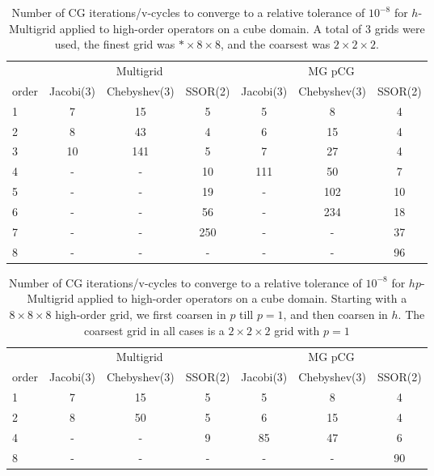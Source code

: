 
\begin{table}
  \caption{\label{tab:homg} Number of CG iterations/v-cycles to converge to a relative tolerance of $10^{-8}$ for $h$-Multigrid applied to high-order operators on a cube domain. A total of 3 grids were used, the finest grid was $*\times 8\times 8$, and the coarsest was $2\times 2\times 2$.}
		\centering
    \begin{tabular}{|l|c|c|c|c|c|c|} 
	    \hline
				    & \multicolumn{3}{c|}{Multigrid} & \multicolumn{3}{c|}{MG pCG}\\  \cline{2-7}
			order & \scriptsize Jacobi(3)  &\scriptsize  Chebyshev(3)  &\scriptsize SSOR(2) &\scriptsize Jacobi(3)  &\scriptsize  Chebyshev(3)  &\scriptsize SSOR(2) \\
			\hline
        1 & 7 & 15 & 5 & 5 & 8 & 4 \\
	    	2 & 8 & 43 & 4 & 6 & 15 & 4 \\
        3 & 10 & 141 & 5 & 7 & 27 & 4 \\
        4 & - & - & 10 & 111 & 50 & 7 \\
				5 & - & - & 19 & - & 102 & 10 \\
        6 & - & - & 56 & - & 234 & 18 \\
			  7 & - & - & 250 & - & - & 37 \\	
				8 & - & - & -   & - & - & 96 \\
			\hline
	  \end{tabular}
\end{table}

\begin{table}
  \caption{\label{tab:hpmg} Number of CG iterations/v-cycles to converge to a relative tolerance of $10^{-8}$ for $hp$-Multigrid applied to high-order operators on a cube domain. Starting with a $8\times 8\times 8$ high-order grid, we first coarsen in $p$ till $p=1$, and then coarsen in $h$. The coarsest grid in all cases is a $2\times 2\times 2$ grid with $p=1$}
		\centering
		\begin{tabular}{|l|c|c|c|c|c|c|} 
	    \hline
				    & \multicolumn{3}{c|}{Multigrid} & \multicolumn{3}{c|}{MG pCG}\\  \cline{2-7}
			order & \scriptsize Jacobi(3)  &\scriptsize  Chebyshev(3)  &\scriptsize SSOR(2) &\scriptsize Jacobi(3)  &\scriptsize  Chebyshev(3)  &\scriptsize SSOR(2) \\
			\hline
        1 & 7 & 15 & 5 & 5 & 8 & 4 \\
        2 & 8 & 50 & 5 & 6 & 15 & 4 \\
			  4 & - & - & 9 & 85 & 47 & 6 \\
        8 & - & - & - & -  &  - & 90 \\
      \hline
	  \end{tabular}
\end{table}

